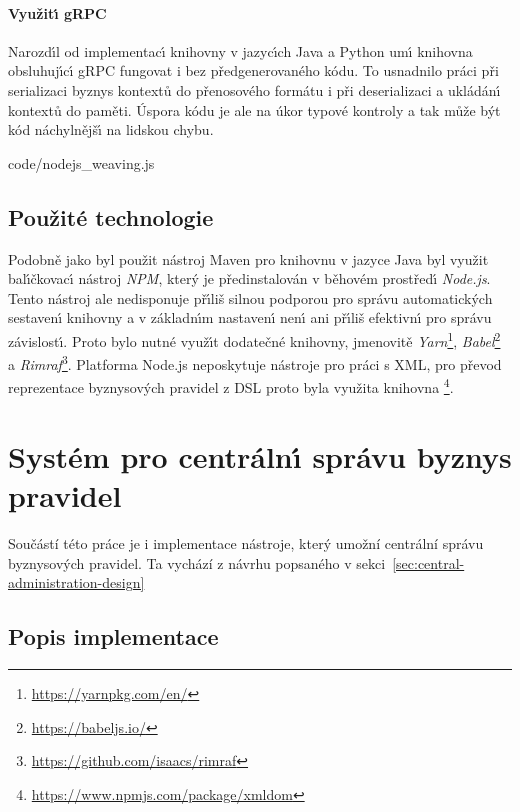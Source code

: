 \paragraph{Využit\'{\i} gRPC} Narozd\'{\i}l od implementac\'{\i} knihovny
v jazyc\'{\i}ch Java a Python um\'{\i} knihovna obsluhuj\'{\i}c\'{\i} gRPC
fungovat i bez předgenerovaného kódu. To usnadnilo
práci při serializaci byznys kontextů do přenosového formátu
i při deserializaci a ukládán\'{\i} kontextů do paměti. Úspora
kódu je ale na úkor typové kontroly a tak může b\'yt kód náchylnějš\'{\i}
na lidskou chybu.


{code/nodejs_weaving.js}

\subsection{Použité technologie}

Podobně jako byl použit nástroj Maven pro knihovnu v jazyce Java byl
využit bal\'{\i}čkovac\'{\i} nástroj \textit{NPM}, kter\'y je předinstalován
v běhovém prostřed\'{\i} \textit{Node.js}. Tento nástroj ale nedisponuje
př\'{\i}liš silnou podporou pro správu automatick\'ych sestaven\'{\i} knihovny
a v základn\'{\i}m nastaven\'{\i} nen\'{\i} ani př\'{\i}liš efektivn\'{\i} pro správu závislost\'{\i}.
Proto bylo nutné využ\'{\i}t dodatečné knihovny, jmenovitě
\textit{Yarn}\footnote{\url{https://yarnpkg.com/en/}}, \textit{Babel}\footnote{\url{https://babeljs.io/}} a
\textit{Rimraf}\footnote{\url{https://github.com/isaacs/rimraf}}.
Platforma Node.js neposkytuje nástroje pro práci s XML, pro převod reprezentace byznysových pravidel z \gls{DSL}
proto byla využita knihovna \footnote{\url{https://www.npmjs.com/package/xmldom}}.

\section{Systém pro centráln\'{\i} správu byznys pravidel}\label{sec:central-administration}

Součástí této práce je i implementace nástroje, který umožní centrální správu byznysových
pravidel. Ta vychází z návrhu popsaného v sekci~\ref{sec:central-administration-design}

\subsection{Popis implementace}

